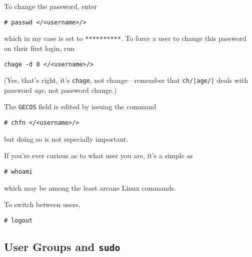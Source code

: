 \documentclass[12pt,letterpaper]{article}
\begin{document}
\begin{enumerate}
To change the password, enter
\begin{lstlisting}
# passwd </<username>/>
\end{lstlisting}
which in my case is set to \lstinline{**********}.  To force a user to change this password on their first login, run
\begin{lstlisting}
chage -d 0 </<username>/>
\end{lstlisting}
(Yes, that's right, it's \lstinline{chage}, not change---remember that \lstinline{ch/|age/|} deals with password \emph{age}, not password change.)

The \lstinline{GECOS} field is edited by issuing the command
\begin{lstlisting}
# chfn </<username>/>
\end{lstlisting}
but doing so is not especially important.

If you're ever curious as to what user you are, it's a simple as
\begin{lstlisting}
# whoami
\end{lstlisting}
which may be among the least arcane Linux commands.

To switch between users,
\begin{lstlisting}
# logout
\end{lstlisting}

\subsection{User Groups and \lstinline{sudo}}




\end{enumerate}
\end{document}
